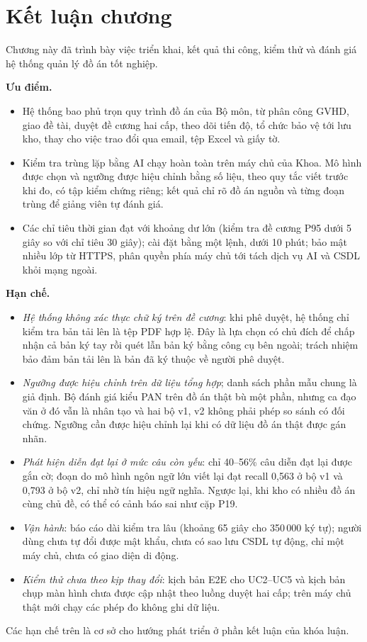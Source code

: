 \documentclass[../main.tex]{subfiles}
\begin{document}
\section{Kết luận chương}

Chương này đã trình bày việc triển khai, kết quả thi công, kiểm thử và đánh giá hệ thống quản lý đồ án tốt nghiệp.

\textbf{Ưu điểm.}
\begin{itemize}
    \item Hệ thống bao phủ trọn quy trình đồ án của Bộ môn, từ phân công GVHD, giao đề tài, duyệt đề cương hai cấp, theo dõi tiến độ, tổ chức bảo vệ tới lưu kho, thay cho việc trao đổi qua email, tệp Excel và giấy tờ.
    \item Kiểm tra trùng lặp bằng AI chạy hoàn toàn trên máy chủ của Khoa. Mô hình được chọn và ngưỡng được hiệu chỉnh bằng số liệu, theo quy tắc viết trước khi đo, có tập kiểm chứng riêng; kết quả chỉ rõ đồ án nguồn và từng đoạn trùng để giảng viên tự đánh giá.
    \item Các chỉ tiêu thời gian đạt với khoảng dư lớn (kiểm tra đề cương P95 dưới 5 giây so với chỉ tiêu 30 giây); cài đặt bằng một lệnh, dưới 10 phút; bảo mật nhiều lớp từ HTTPS, phân quyền phía máy chủ tới tách dịch vụ AI và CSDL khỏi mạng ngoài.
\end{itemize}

\textbf{Hạn chế.}
\begin{itemize}
    \item \textit{Hệ thống không xác thực chữ ký trên đề cương}: khi phê duyệt, hệ thống chỉ kiểm tra bản tải lên là tệp PDF hợp lệ. Đây là lựa chọn có chủ đích để chấp nhận cả bản ký tay rồi quét lẫn bản ký bằng công cụ bên ngoài; trách nhiệm bảo đảm bản tải lên là bản đã ký thuộc về người phê duyệt.
    \item \textit{Ngưỡng được hiệu chỉnh trên dữ liệu tổng hợp}; danh sách phần mẫu chung là giả định. Bộ đánh giá kiểu PAN trên đồ án thật bù một phần, nhưng ca đạo văn ở đó vẫn là nhân tạo và hai bộ v1, v2 không phải phép so sánh có đối chứng. Ngưỡng cần được hiệu chỉnh lại khi có dữ liệu đồ án thật được gán nhãn.
    \item \textit{Phát hiện diễn đạt lại ở mức câu còn yếu}: chỉ 40--56\% câu diễn đạt lại được gắn cờ; đoạn do mô hình ngôn ngữ lớn viết lại đạt recall 0,563 ở bộ v1 và 0,793 ở bộ v2, chỉ nhờ tín hiệu ngữ nghĩa. Ngược lại, khi kho có nhiều đồ án cùng chủ đề, có thể có cảnh báo sai như cặp P19.
    \item \textit{Vận hành}: báo cáo dài kiểm tra lâu (khoảng 65 giây cho 350\,000 ký tự); người dùng chưa tự đổi được mật khẩu, chưa có sao lưu CSDL tự động, chỉ một máy chủ, chưa có giao diện di động.
    \item \textit{Kiểm thử chưa theo kịp thay đổi}: kịch bản E2E cho UC2--UC5 và kịch bản chụp màn hình chưa được cập nhật theo luồng duyệt hai cấp; trên máy chủ thật mới chạy các phép đo không ghi dữ liệu.
\end{itemize}

Các hạn chế trên là cơ sở cho hướng phát triển ở phần kết luận của khóa luận.
\end{document}
